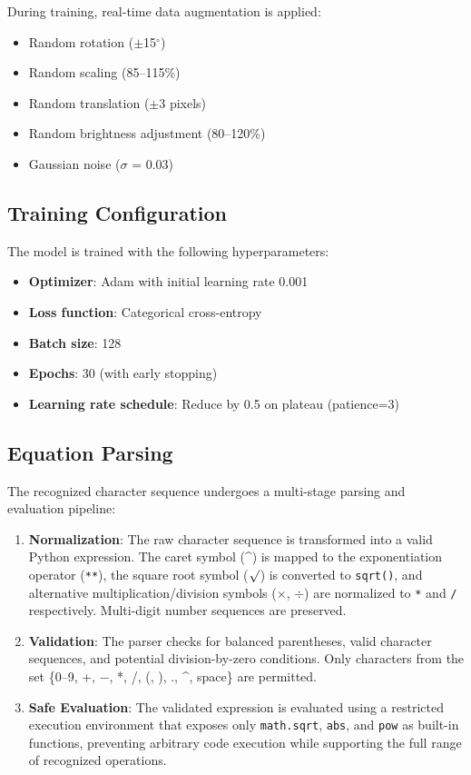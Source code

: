 \documentclass[conference]{IEEEtran}
\begin{document}
During training, real-time data augmentation is applied:

\begin{itemize}
    \item Random rotation ($\pm$15$^\circ$)
    \item Random scaling (85--115\%)
    \item Random translation ($\pm$3 pixels)
    \item Random brightness adjustment (80--120\%)
    \item Gaussian noise ($\sigma$ = 0.03)
\end{itemize}

\subsection{Training Configuration}

The model is trained with the following hyperparameters:

\begin{itemize}
    \item \textbf{Optimizer}: Adam with initial learning rate 0.001
    \item \textbf{Loss function}: Categorical cross-entropy
    \item \textbf{Batch size}: 128
    \item \textbf{Epochs}: 30 (with early stopping)
    \item \textbf{Learning rate schedule}: Reduce by 0.5 on plateau (patience=3)
\end{itemize}

\subsection{Equation Parsing}

The recognized character sequence undergoes a multi-stage parsing and evaluation pipeline:

\begin{enumerate}
    \item \textbf{Normalization}: The raw character sequence is transformed into a valid Python expression. The caret symbol (\^{}) is mapped to the exponentiation operator (\texttt{**}), the square root symbol ($\surd$) is converted to \texttt{sqrt()}, and alternative multiplication/division symbols ($\times$, $\div$) are normalized to \texttt{*} and \texttt{/} respectively. Multi-digit number sequences are preserved.
    \item \textbf{Validation}: The parser checks for balanced parentheses, valid character sequences, and potential division-by-zero conditions. Only characters from the set \{0--9, +, $-$, *, /, (, ), ., \^{}, space\} are permitted.
    \item \textbf{Safe Evaluation}: The validated expression is evaluated using a restricted execution environment that exposes only \texttt{math.sqrt}, \texttt{abs}, and \texttt{pow} as built-in functions, preventing arbitrary code execution while supporting the full range of recognized operations.
\end{enumerate}
\end{document}
